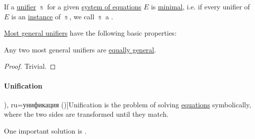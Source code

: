 \begin{definition}\label{def:fol_most_general_unifier}
  If a \hyperref[def:fol_equation/syntactic_solution]{unifier} \( \Bbbs \) for a given \hyperref[def:fol_equation/system]{system of equations} \( E \) is \hyperref[def:extremal_points/maximal_and_minimal_element]{minimal}, i.e. if every unifier of \( E \) is an \hyperref[def:fol_substitution_instance]{instance} of \( \Bbbs \), we call \( \Bbbs \) a .
\end{definition}

\begin{proposition}\label{thm:def:fol_most_general_unifier}
  \hyperref[def:fol_most_general_unifier]{Most general unifiers} have the following basic properties:
  \begin{thmenum}
     Any two most general unifiers are \hyperref[def:fol_substitution_equivalence]{equally general}.
  \end{thmenum}
\end{proposition}
\begin{proof}
   Trivial.
\end{proof}

\paragraph{Unification}

\begin{problem}[Unification]\label{prob:unification}
  \term[en=unification (\cite[71]{BaaderNipkow2012TermRewriting}), ru=унификация (\cite[\S 4.3]{Герасимов2014Вычислимость})]{Unification} is the problem of solving \hyperref[def:equation]{equations} symbolically, where the two sides are transformed until they match.
\end{problem}
\begin{comments}
  \item One important solution is .
\end{comments}

